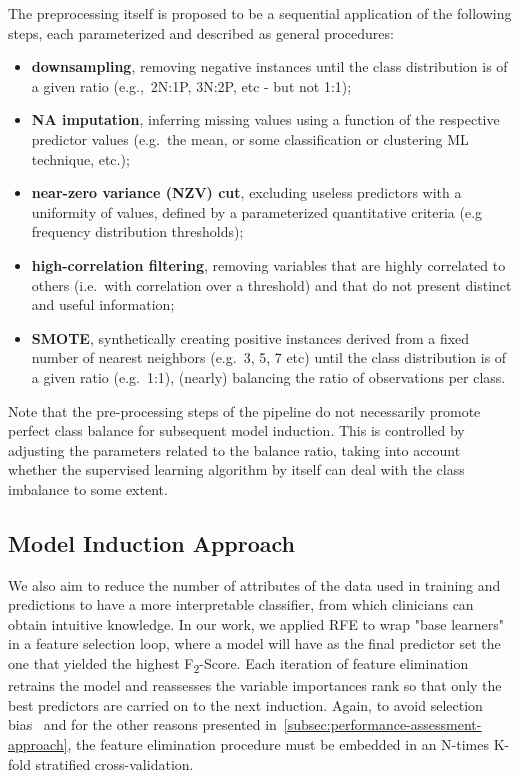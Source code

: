 The preprocessing itself is proposed to be a sequential application of the following steps, each parameterized and described as general procedures:
\begin{itemize}
    \item \textbf{downsampling}, removing negative instances until the class distribution is of a given ratio (e.g.,\ 2N:1P, 3N:2P, etc - but not 1:1);
    \item \textbf{NA imputation}, inferring missing values using a function of the respective predictor values (e.g.\, the mean, or some classification or clustering ML technique, etc.);
    \item \textbf{near-zero variance (NZV) cut}, excluding useless predictors with a uniformity of values, defined by a parameterized quantitative criteria (e.g\, frequency distribution thresholds);
    \item \textbf{high-correlation filtering}, removing variables that are highly correlated to others (i.e.\ with correlation over a threshold) and that do not present distinct and useful information;
    \item \textbf{SMOTE}, synthetically creating positive instances derived from a fixed number of nearest neighbors (e.g.\ 3, 5, 7 etc) until the class distribution is of a given ratio (e.g.\ 1:1), (nearly) balancing the ratio of observations per class.
\end{itemize}

Note that the pre-processing steps of the pipeline do not necessarily promote perfect class balance for subsequent model induction.
This is controlled by adjusting the parameters related to the balance ratio, taking into account whether the supervised learning algorithm by itself can deal with the class imbalance to some extent.

\subsection{Model Induction Approach}\label{subsec:model-induction-approach}

We also aim to reduce the number of attributes of the data used in training and predictions to have a more interpretable classifier, from which clinicians can obtain intuitive knowledge.
In our work, we applied RFE to wrap "base learners" in a feature selection loop, where a model will have as the final predictor set the one that yielded the highest F\textsubscript{2}-Score.
Each iteration of feature elimination retrains the model and reassesses the variable importances rank so that only the best predictors are carried on to the next induction.
Again, to avoid selection bias~\cite{Ambroise2002, Reunanen2003} and for the other reasons presented in~\ref{subsec:performance-assessment-approach}, the feature elimination procedure must be embedded in an N-times K-fold stratified cross-validation.

